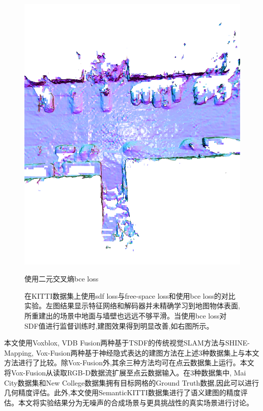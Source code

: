 \begin{figure}[htbp]
\begin{minipage}{0.45\linewidth}
		\includegraphics[width=1\linewidth]{figures/kittiobce.png}
        \caption*{使用二元交叉熵bce loss}
	\end{minipage}
    \caption{在KITTI数据集上使用sdf loss与free-space loss和使用bce loss的对比实验。左图结果显示特征网络和解码器并未精确学习到地图物体表面,所重建出的场景中地面与墙壁也远远不够平滑。当使用bce loss对SDF值进行监督训练时,建图效果得到明显改善,如右图所示。}\label{becornot}
\end{figure}
\clearpage
本文使用Voxblox, VDB Fusion两种基于TSDF的传统视觉SLAM方法与SHINE-Mapping, Vox-Fusion两种基于神经隐式表达的建图方法在上述3种数据集上与本文方法进行了比较。除Vox-Fusion外,其余三种方法均可在点云数据集上运行。本文将Vox-Fusion从读取RGB-D数据流扩展至点云数据输入。在3种数据集中, Mai City数据集和New College数据集拥有目标网格的Ground Truth数据,因此可以进行几何精度评估。此外,本文使用SemanticKITTI数据集进行了语义建图的精度评估。本文将实验结果分为无噪声的合成场景与更具挑战性的真实场景进行讨论。
